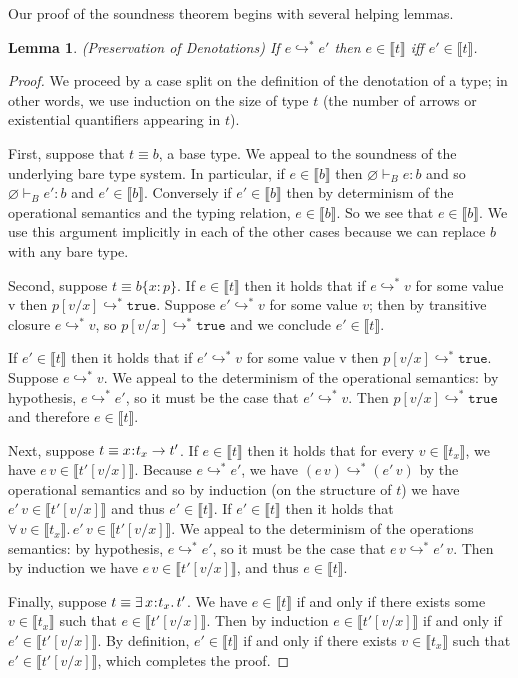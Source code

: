 \documentclass[11pt]{article}
\newtheorem{lemma}[theorem]{Lemma}
\newcommand{\bind}{\hspace{0.05em}{:}\hspace{0.05em}} %
\newcommand{\col}{\mathbin{:}}       %
\newcommand{\lb}{\llbracket}         %
\newcommand{\rb}{\rrbracket}         %
\newcommand{\many}{\hookrightarrow^*}
\newcommand{\true}{\mathtt{true}}
\begin{document}
Our proof of the soundness theorem begins with several helping lemmas.

\begin{lemma}{(Preservation of Denotations)
If $e \hookrightarrow^* e'$ then $e \in \lb t\rb$ iff $e' \in \lb t\rb$.}\label{pres-den}
\end{lemma}
\begin{proof}
We proceed by a case split on the definition of the denotation of a type; in other words, we use induction on the size of type $t$ (the number of arrows or existential quantifiers appearing in $t$).

First, suppose that $t \equiv b$, a base type. We appeal to the soundness of the underlying bare type system. In particular, if
$e \in \lb b \rb$ then $\varnothing \vdash_B e : b$ and so $\varnothing \vdash_B e' : b$ and $e' \in \lb b \rb$.
Conversely if $e' \in \lb b \rb$ then by determinism of the operational semantics and the typing relation, $e \in \lb b \rb$. So we see that $e \in \lb b\rb$. We use this argument implicitly in each of the other cases because we can replace $b$ with any bare type.

Second, suppose $t \equiv b\{x\col p\}$.
If $e \in \lb t\rb$ then it holds that 
if $e \many v$ for some value v then $p[v/x] \many \true$.
Suppose $e' \many v$ for some value $v$; then by transitive closure $e \many v$, so $p[v/x] \many \true$ and we conclude $e' \in \lb t \rb$.

If $e' \in \lb t\rb$ then it holds that %
if $e' \many v$ for some value v then $p[v/x] \many \true$. Suppose $e \many v$. We appeal to the determinism of the operational semantics: by hypothesis, $e \many e'$, so it must be the case that $e' \many v$. Then $p[v/x] \many \true$ and %
therefore $e \in \lb t \rb$.

Next, suppose $t \equiv x\bind t_x \rightarrow t'$.
If $e \in \lb t\rb$ then it holds that %
for every $v \in \lb t_x \rb$, we have $e\, v \in \lb t'[v/x]\rb$.
Because $e \many e'$, we have $(e\, v) \many (e'\, v)$ by the operational semantics and so by induction (on the structure of  $t$) we have $e'\, v \in \lb t'[v/x]\rb$ and thus $e' \in \lb t\rb$.
If $e' \in \lb t\rb$ then it holds that %
$\forall\, v \in \lb t_x \rb.\, e'\, v \in \lb t'[v/x]\rb$.
We appeal to the determinism of the operations semantics: by hypothesis, $e \many e'$, so it must be the case that $e\, v \many e'\, v$. Then by induction we have $e\, v \in \lb t'[v/x]\rb$, and thus $e\in\lb t\rb$.

Finally, suppose $t \equiv \exists\, x\bind t_x.\, t'$. We have $e \in \lb t \rb$ if and only if there exists some $v \in \lb t_x \rb$ such that 
$e \in \lb t'[v/x]\rb$. Then by induction $e \in \lb t'[v/x]\rb$ if and only if $e' \in \lb t'[v/x]\rb$. By definition, $e' \in \lb t\rb$ if and only if there exists $v \in \lb t_x\rb$ such that $e'\in\lb t'[v/x]\rb$, which completes the proof.
\end{proof}
\end{document}
